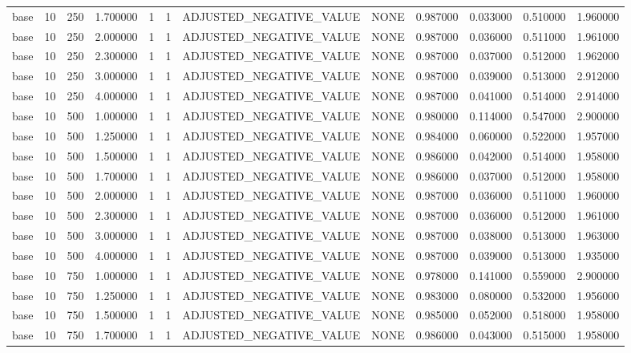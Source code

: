 \begin{tabular}{lrrrllllrrrr}
base & 10 & 250 & 1.700000 & 1 & 1 & ADJUSTED_NEGATIVE_VALUE & NONE & 0.987000 & 0.033000 & 0.510000 & 1.960000 \\
base & 10 & 250 & 2.000000 & 1 & 1 & ADJUSTED_NEGATIVE_VALUE & NONE & 0.987000 & 0.036000 & 0.511000 & 1.961000 \\
base & 10 & 250 & 2.300000 & 1 & 1 & ADJUSTED_NEGATIVE_VALUE & NONE & 0.987000 & 0.037000 & 0.512000 & 1.962000 \\
base & 10 & 250 & 3.000000 & 1 & 1 & ADJUSTED_NEGATIVE_VALUE & NONE & 0.987000 & 0.039000 & 0.513000 & 2.912000 \\
base & 10 & 250 & 4.000000 & 1 & 1 & ADJUSTED_NEGATIVE_VALUE & NONE & 0.987000 & 0.041000 & 0.514000 & 2.914000 \\
base & 10 & 500 & 1.000000 & 1 & 1 & ADJUSTED_NEGATIVE_VALUE & NONE & 0.980000 & 0.114000 & 0.547000 & 2.900000 \\
base & 10 & 500 & 1.250000 & 1 & 1 & ADJUSTED_NEGATIVE_VALUE & NONE & 0.984000 & 0.060000 & 0.522000 & 1.957000 \\
base & 10 & 500 & 1.500000 & 1 & 1 & ADJUSTED_NEGATIVE_VALUE & NONE & 0.986000 & 0.042000 & 0.514000 & 1.958000 \\
base & 10 & 500 & 1.700000 & 1 & 1 & ADJUSTED_NEGATIVE_VALUE & NONE & 0.986000 & 0.037000 & 0.512000 & 1.958000 \\
base & 10 & 500 & 2.000000 & 1 & 1 & ADJUSTED_NEGATIVE_VALUE & NONE & 0.987000 & 0.036000 & 0.511000 & 1.960000 \\
base & 10 & 500 & 2.300000 & 1 & 1 & ADJUSTED_NEGATIVE_VALUE & NONE & 0.987000 & 0.036000 & 0.512000 & 1.961000 \\
base & 10 & 500 & 3.000000 & 1 & 1 & ADJUSTED_NEGATIVE_VALUE & NONE & 0.987000 & 0.038000 & 0.513000 & 1.963000 \\
base & 10 & 500 & 4.000000 & 1 & 1 & ADJUSTED_NEGATIVE_VALUE & NONE & 0.987000 & 0.039000 & 0.513000 & 1.935000 \\
base & 10 & 750 & 1.000000 & 1 & 1 & ADJUSTED_NEGATIVE_VALUE & NONE & 0.978000 & 0.141000 & 0.559000 & 2.900000 \\
base & 10 & 750 & 1.250000 & 1 & 1 & ADJUSTED_NEGATIVE_VALUE & NONE & 0.983000 & 0.080000 & 0.532000 & 1.956000 \\
base & 10 & 750 & 1.500000 & 1 & 1 & ADJUSTED_NEGATIVE_VALUE & NONE & 0.985000 & 0.052000 & 0.518000 & 1.958000 \\
base & 10 & 750 & 1.700000 & 1 & 1 & ADJUSTED_NEGATIVE_VALUE & NONE & 0.986000 & 0.043000 & 0.515000 & 1.958000 \\

\end{tabular}
